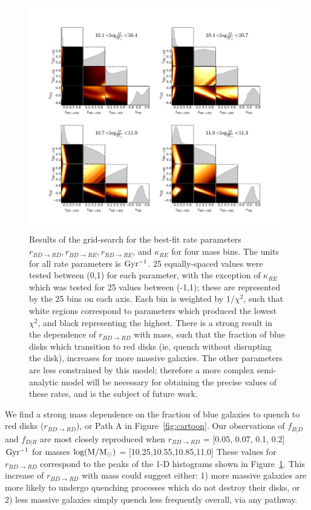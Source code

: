 \documentclass[useAMS,usenatbib]{mn2e}
\begin{document}
\begin{figure}
\centering
\includegraphics[width=\textwidth,trim={0cm 0cm 2cm 1cm},clip]{figures/corner_plot.pdf}
\caption{Results of the grid-search for the best-fit rate parameters $r_{BD \rightarrow RD}, r_{BD \rightarrow RE}, r_{RD \rightarrow RE}$, and $\kappa_{RE}$ for four mass bins. The units for all rate parameters is $\rm Gyr^{-1}$. 25 equally-spaced values were tested between (0,1) for each parameter, with the exception of $\kappa_{RE}$ which was tested for 25 values between (-1,1); these are represented by the 25 bins on each axis. Each bin is weighted by $1/\chi^2$, such that white regions correspond to parameters which produced the lowest $\chi^2$, and black representing the highest. There is a strong result in the dependence of $r_{BD \rightarrow RD}$ with mass, such that the fraction of blue disks which transition to red disks (ie, quench without disrupting the disk), increases for more massive galaxies. The other parameters are less constrained by this model; therefore a more complex semi-analytic model will be necessary for obtaining the precise values of these rates, and is the subject of future work.}
\label{fig:corner}
\end{figure} 

We find a strong mass dependence on the fraction of blue galaxies to quench to red disks ($r_{BD \rightarrow RD}$), or Path A in Figure~\ref{fig:cartoon}. Our observations of $f_{R|D}$ and $f_{D|R}$ are most closely reproduced when $r_{BD \rightarrow RD}$ = [0.05, 0.07, 0.1, 0.2] $\rm Gyr^{-1}$ for masses $\rm log(M/M_{\odot})$ = [10.25,10.55,10.85,11.0] These values for $r_{BD \rightarrow RD}$ correspond to the peaks of the 1-D histograms shown in Figure~\ref{fig:corner}. This increase of $r_{BD \rightarrow RD}$ with mass could suggest either: 1) more massive galaxies are more likely to undergo quenching processes which do not destroy their disks, or 2) less massive galaxies simply quench less frequently overall, via any pathway. 
\end{document}
